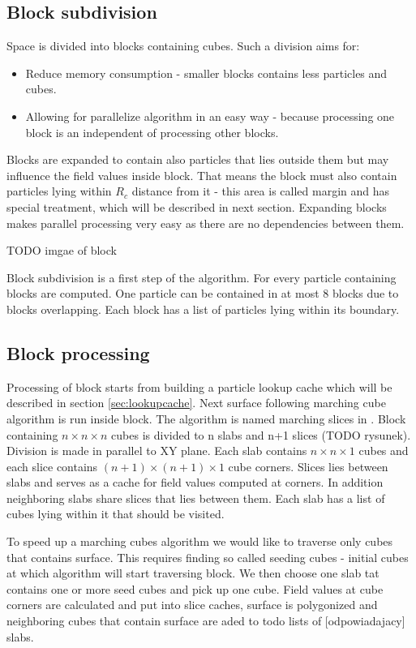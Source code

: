 \subsection{Block subdivision} \label{sec:block_subdivision}
Space is divided into blocks containing cubes. Such a division aims for:
\begin{itemize}
\item Reduce memory consumption - smaller blocks contains less particles and cubes. 
\item Allowing for parallelize algorithm in an easy way - because processing one block is an independent of processing other blocks. 
\end{itemize}
Blocks are expanded to contain also particles that lies outside them but may influence the field values inside block. That means the block must also contain particles lying within $R_c$ distance from it - this area is called margin and has special treatment, which will be described in next section. Expanding blocks makes parallel processing very easy as there are no dependencies between them.

TODO imgae of block

Block subdivision is a first step of the algorithm. For every particle containing blocks are computed. One particle can be contained in at most 8 blocks due to blocks overlapping. Each block has a list of particles lying within its boundary. 

\subsection{Block processing} \label{sec:block_processing}
Processing of block starts from building a particle lookup cache which will be described in section \ref{sec:lookupcache}. Next surface following marching cube algorithm is run inside block. The algorithm is named marching slices in \cite{RosenbergBirdwell2008}. Block containing $n \times n \times n$ cubes is divided to n slabs and n+1 slices (TODO rysunek). Division is made in parallel to XY plane. Each slab contains $n \times n \times 1$ cubes and each slice contains $(n+1) \times (n+1) \times 1$ cube corners. Slices lies between slabs and serves as a cache for field values computed at corners. In addition neighboring slabs share slices that lies between them. Each slab has a list of cubes lying within it that should be visited.

To speed up a marching cubes algorithm we would like to traverse only cubes that contains surface. This requires finding so called seeding cubes - initial cubes at which algorithm will start traversing block. We then choose one slab tat contains one or more seed cubes and pick up one cube. Field values at cube corners are calculated and put into slice caches, surface is polygonized and neighboring cubes that contain surface are aded to todo lists of [odpowiadajacy] slabs. 

